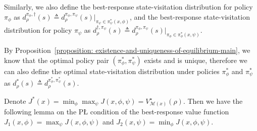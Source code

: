 \documentclass{article}
\theoremstyle{plain}
\theoremstyle{definition}
\theoremstyle{remark}
\def\cM{\mathcal M}
\def\bydef{\triangleq}
\begin{document}
Similarly, we also define the best-response state-visitation distribution for policy $\pi_\phi$ as
$d^{\pi_\phi,\dag}_{\rho}(s) \bydef d^{\pi_\phi, \pi_\psi}_\rho(s) \big|_{\pi_\psi \in \pi^*_\psi(x,\phi)}$,
and the best-response state-visitation distribution for policy $\pi_\psi$ as
$d^{\dag, \pi_\psi}_{\rho}(s) \bydef d^{\pi_\phi, \pi_\psi}_\rho(s) \big|_{\pi_\phi \in \pi^*_\phi(x,\psi)}$.

By Proposition~\ref{proposition: existence-and-uniqueness-of-equilibrium-main}, we know that the optimal policy pair $(\pi_\phi^*,\pi_\psi^*)$ exists and is unique, therefore we can also define the optimal state-visitation distribution under policies $\pi_\phi^*$ and $\pi_\psi^*$ as
$d^{*}_{\rho}(s) \bydef d^{\pi_\phi^*, \pi_\psi^*}_\rho(s)$.

Denote $J^*(x) = \min_\phi \max_\psi J(x,\phi,\psi) = V^{\star}_{\cM(x)}(\rho)$. Then we have the following lemma on the P{\L} condition of the best-response value function $J_1(x,\phi) = \max_{\psi } J(x,\phi,\psi)$ and $J_2(x,\psi) = \min_{\phi } J(x,\phi,\psi)$.
\end{document}
